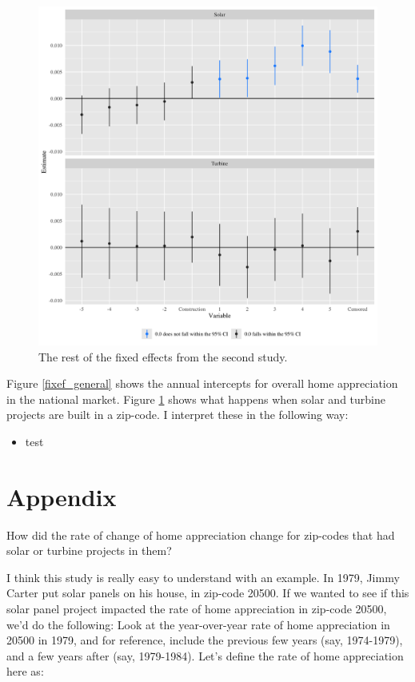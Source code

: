 \documentclass{article}
\begin{document}
\begin{figure}[h]
\centering
\includegraphics[width=0.9\linewidth]
{fixef_manipulation.png} 
\caption{The rest of the fixed effects from the second study.}
\label{fixef_manipulation}
\end{figure}

Figure \ref{fixef_general} shows the annual intercepts for overall home appreciation in the national market.
Figure \ref{fixef_manipulation} shows what happens when solar and turbine projects are built in a zip-code.
I interpret these in the following way:
\begin{itemize}
\item test
\end{itemize}


\section{Appendix}

How did the rate of change of home appreciation change for zip-codes that had solar or turbine projects in them?

I think this study is really easy to understand with an example.
In 1979, Jimmy Carter put solar panels on his house, in zip-code 20500.
If we wanted to see if this solar panel project impacted the rate of home appreciation in zip-code 20500, we'd do the following:
Look at the year-over-year rate of home appreciation in 20500 in 1979, and for reference, include the previous few years (say, 1974-1979), and a few years after (say, 1979-1984).
Let's define the rate of home appreciation here as:
\end{document}
